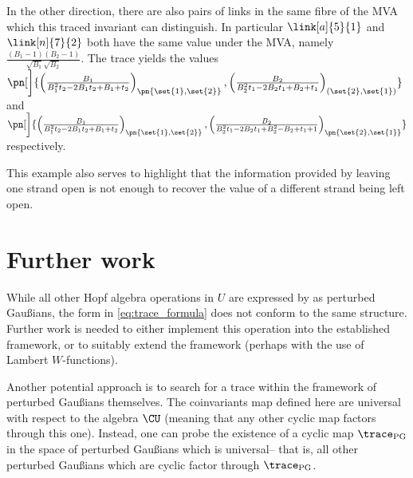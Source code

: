 In the other direction, there are also pairs of links in the same fibre of the
\ac{MVA} which this traced invariant can distinguish. In particular
$\link[a]{5}{1}$ and $\link[n]{7}{2}$ both have the same value under the
\ac{MVA}, namely
$\frac{\left(B_1-1\right) \left(B_2-1\right)}{\sqrt{B_1} \sqrt{B_2}}$.
The trace yields the values
$ \pn[\bigg]{
        \left(
                \frac{B_1}{B_1^2 t_2  -2 B_1 t_2  +B_1+t_2}
        \right)_{\pn{\set{1},\set{2}}},
        \left(
                \frac{B_2}{B_2^2 t_1  -2 B_2 t_1  +B_2+t_1}
        \right)_{(\set{2},\set{1})}
        }$
and
$\pn[\bigg]{
        \left(
                \frac{B_1}{B_1^2 t_2  -2 B_1 t_2  +B_1+t_2}
        \right)_{\pn{\set{1},\set{2}}},
        \left(
                \frac{B_2}{B_2^2 t_1  -2 B_2 t_1  +B_2^2-B_2+t_1 +1}
        \right)_{\pn{\set{2},\set{1}}}
}$
respectively.

This example also serves to highlight that the information provided by leaving
one strand open is not enough to recover the value of a different strand being
left open.

\section{Further work}
While all other Hopf algebra operations in $U$ are expressed by \cite{BV} as
perturbed Gaußians, the form in \cref{eq:trace_formula} does not conform to the
same structure. Further work is needed to either implement this operation into
the established framework, or to suitably extend the framework (perhaps with the
use of Lambert $W$-functions).

Another potential approach is to search for a trace within the framework of
perturbed Gaußians themselves. The coinvariants map defined here are universal
with respect to the algebra $\CU$ (meaning that any other cyclic map factors
through this one). Instead, one can probe the existence of a cyclic map
$\trace_{\text{PG}}$ in the space of perturbed Gaußians which is universal--
that is, all other perturbed Gaußians which are cyclic factor through
$\trace_{\text{PG}}$.
